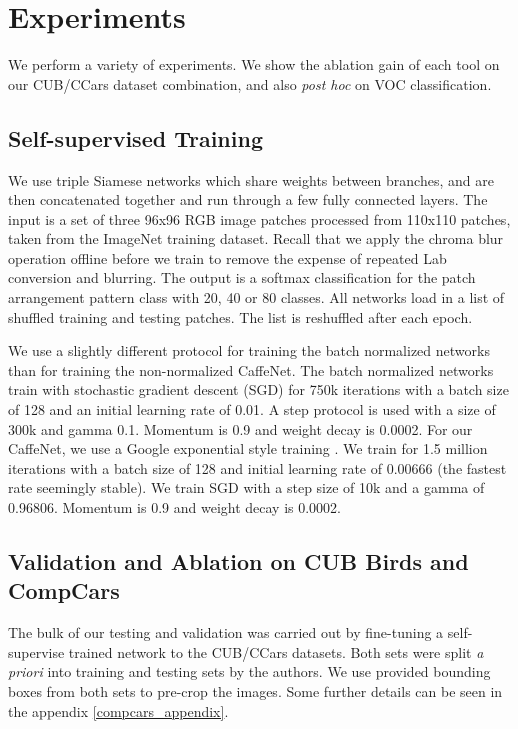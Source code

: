 \documentclass[10pt,twocolumn,letterpaper]{article}
\begin{document}
\section{Experiments}

We perform a variety of experiments. We show the ablation gain of each tool on our CUB/CCars dataset combination, and also \emph{post hoc} on VOC classification.

\subsection{Self-supervised Training}

We use triple Siamese networks which share weights between branches, and are then concatenated together and run through a few fully connected layers. The input is a set of three 96x96 RGB image patches processed from 110x110 patches, taken from the ImageNet training dataset. Recall that we apply the chroma blur operation offline before we train to remove the expense of repeated Lab conversion and blurring. The output is a softmax classification for the patch arrangement pattern class with 20, 40 or 80 classes. All networks load in a list of shuffled training and testing patches. The list is reshuffled after each epoch. 

We use a slightly different protocol for training the batch normalized networks than for training the non-normalized CaffeNet. The batch normalized networks train with stochastic gradient descent (SGD) for 750k iterations with a batch size of 128 and an initial learning rate of 0.01. A step protocol is used with a size of 300k and gamma 0.1. Momentum is 0.9 and weight decay is 0.0002. For our CaffeNet, we use a Google exponential style training \cite{Inceptionv4}. We train for 1.5 million iterations with a batch size of 128 and initial learning rate of 0.00666 (the fastest rate seemingly stable). We train SGD with a step size of 10k and a gamma of 0.96806. Momentum is 0.9 and weight decay is 0.0002. 

\subsection{Validation and Ablation on CUB Birds and CompCars}

The bulk of our testing and validation was carried out by fine-tuning a self-supervise trained network to the CUB/CCars datasets. Both sets were split \emph{a priori} into training and testing sets by the authors. We use provided bounding boxes from both sets to pre-crop the images. Some further details can be seen in the appendix \ref{compcars_appendix}.
\end{document}
